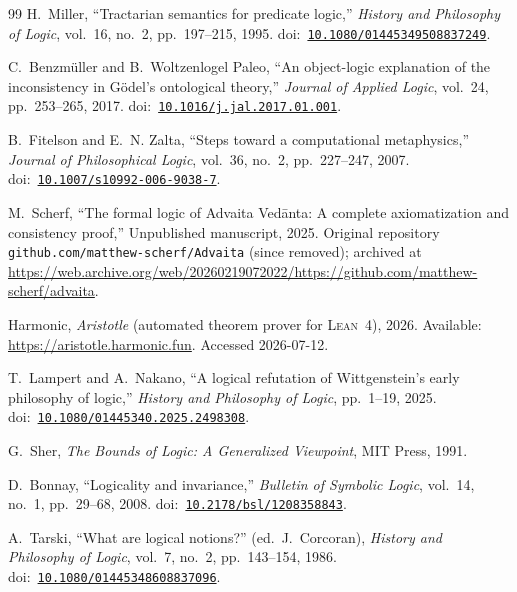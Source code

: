 \documentclass[jsl,bibother]{asl}
\theoremstyle{definition}
\theoremstyle{remark}
\newcommand{\Lean}{\textsc{Lean}}
\begin{document}
\begin{thebibliography}{99}
H.~Miller,
``Tractarian semantics for predicate logic,''
\emph{History and Philosophy of Logic}, vol.~16, no.~2,
pp.~197--215, 1995.
\newline doi:~\href{https://doi.org/10.1080/01445349508837249}{\texttt{10.1080/01445349508837249}}.

C.~Benzm\"uller and B.~Woltzenlogel Paleo,
``An object-logic explanation of the inconsistency in G\"odel's
ontological theory,''
\emph{Journal of Applied Logic}, vol.~24, pp.~253--265, 2017.
\newline doi:~\href{https://doi.org/10.1016/j.jal.2017.01.001}{\texttt{10.1016/j.jal.2017.01.001}}.

B.~Fitelson and E.~N. Zalta,
``Steps toward a computational metaphysics,''
\emph{Journal of Philosophical Logic}, vol.~36, no.~2,
pp.~227--247, 2007.
\newline doi:~\href{https://doi.org/10.1007/s10992-006-9038-7}{\texttt{10.1007/s10992-006-9038-7}}.

M.~Scherf,
``The formal logic of Advaita Ved\=anta: A complete
axiomatization and consistency proof,''
Unpublished manuscript, 2025.
Original repository \texttt{github.com/matthew-scherf/Advaita}
(since removed); archived at
\url{https://web.archive.org/web/20260219072022/https://github.com/matthew-scherf/advaita}.

Harmonic,
\emph{Aristotle} (automated theorem prover for \Lean~4), 2026.
Available: \url{https://aristotle.harmonic.fun}.
Accessed 2026-07-12.

T.~Lampert and A.~Nakano,
``A logical refutation of Wittgenstein's early philosophy of
logic,''
\emph{History and Philosophy of Logic}, pp.~1--19, 2025.
\newline doi:~\href{https://doi.org/10.1080/01445340.2025.2498308}{\texttt{10.1080/01445340.2025.2498308}}.

G.~Sher,
\emph{The Bounds of Logic: A Generalized Viewpoint},
MIT Press, 1991.

D.~Bonnay,
``Logicality and invariance,''
\emph{Bulletin of Symbolic Logic}, vol.~14, no.~1, pp.~29--68,
2008.
\newline doi:~\href{https://doi.org/10.2178/bsl/1208358843}{\texttt{10.2178/bsl/1208358843}}.

A.~Tarski,
``What are logical notions?''
(ed.\ J.~Corcoran),
\emph{History and Philosophy of Logic}, vol.~7, no.~2,
pp.~143--154, 1986.
\newline doi:~\href{https://doi.org/10.1080/01445348608837096}{\texttt{10.1080/01445348608837096}}.


\end{thebibliography}
\end{document}
